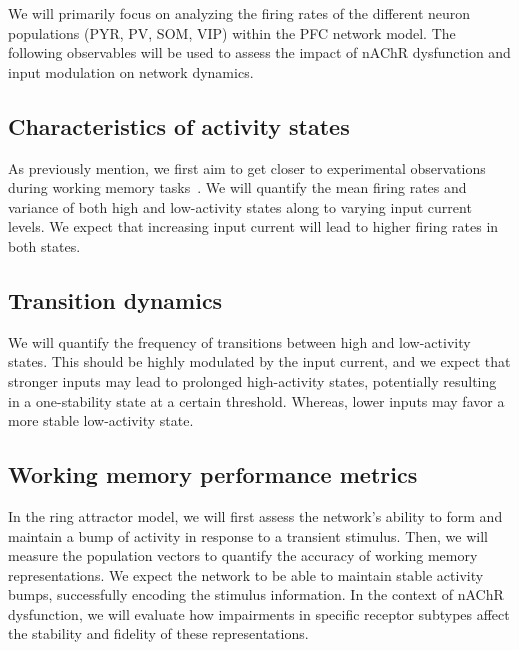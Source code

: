 \documentclass[10pt,letterpaper]{article}
\begin{document}
We will primarily focus on analyzing the firing rates of the different neuron populations (PYR, PV, SOM, VIP) within the PFC network model. The following observables will be used to assess the impact of nAChR dysfunction and input modulation on network dynamics.

\subsection{Characteristics of activity states}
As previously mention, we first aim to get closer to experimental observations during working memory tasks~\citep{Compte2003}. We will quantify the mean firing rates and variance of both high and low-activity states along to varying input current levels. We expect that increasing input current will lead to higher firing rates in both states.

\newpage
\subsection{Transition dynamics}
We will quantify the frequency of transitions between high and low-activity states. This should be highly modulated by the input current, and we expect that stronger inputs may lead to prolonged high-activity states, potentially resulting in a one-stability state at a certain threshold. Whereas, lower inputs may favor a more stable low-activity state.

\subsection{Working memory performance metrics}
In the ring attractor model, we will first assess the network's ability to form and maintain a bump of activity in response to a transient stimulus. Then, we will measure the population vectors to quantify the accuracy of working memory representations. We expect the network to be able to maintain stable activity bumps, successfully encoding the stimulus information. In the context of nAChR dysfunction, we will evaluate how impairments in specific receptor subtypes affect the stability and fidelity of these representations.

\newpage


\end{document}
